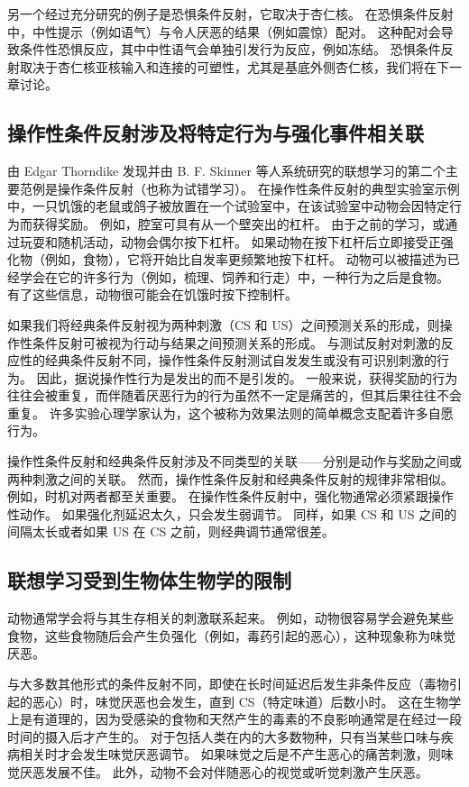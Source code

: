 另一个经过充分研究的例子是恐惧条件反射，它取决于杏仁核。
在恐惧条件反射中，中性提示（例如语气）与令人厌恶的结果（例如震惊）配对。
这种配对会导致条件性恐惧反应，其中中性语气会单独引发行为反应，例如冻结。
恐惧条件反射取决于杏仁核亚核输入和连接的可塑性，尤其是基底外侧杏仁核，我们将在下一章讨论。



\subsection{操作性条件反射涉及将特定行为与强化事件相关联}

由 Edgar Thorndike 发现并由 B. F. Skinner 等人系统研究的联想学习的第二个主要范例是操作条件反射（也称为试错学习）。
在操作性条件反射的典型实验室示例中，一只饥饿的老鼠或鸽子被放置在一个试验室中，在该试验室中动物会因特定行为而获得奖励。
例如，腔室可具有从一个壁突出的杠杆。 由于之前的学习，或通过玩耍和随机活动，动物会偶尔按下杠杆。
如果动物在按下杠杆后立即接受正强化物（例如，食物），它将开始比自发率更频繁地按下杠杆。
动物可以被描述为已经学会在它的许多行为（例如，梳理、饲养和行走）中，一种行为之后是食物。
有了这些信息，动物很可能会在饥饿时按下控制杆。


如果我们将经典条件反射视为两种刺激（CS 和 US）之间预测关系的形成，则操作性条件反射可被视为行动与结果之间预测关系的形成。
与测试反射对刺激的反应性的经典条件反射不同，操作性条件反射测试自发发生或没有可识别刺激的行为。
因此，据说操作性行为是发出的而不是引发的。
一般来说，获得奖励的行为往往会被重复，而伴随着厌恶行为的行为虽然不一定是痛苦的，但其后果往往不会重复。
许多实验心理学家认为，这个被称为效果法则的简单概念支配着许多自愿行为。


操作性条件反射和经典条件反射涉及不同类型的关联——分别是动作与奖励之间或两种刺激之间的关联。
然而，操作性条件反射和经典条件反射的规律非常相似。 例如，时机对两者都至关重要。
在操作性条件反射中，强化物通常必须紧跟操作性动作。
如果强化剂延迟太久，只会发生弱调节。
同样，如果 CS 和 US 之间的间隔太长或者如果 US 在 CS 之前，则经典调节通常很差。



\subsection{联想学习受到生物体生物学的限制}

动物通常学会将与其生存相关的刺激联系起来。
例如，动物很容易学会避免某些食物，这些食物随后会产生负强化（例如，毒药引起的恶心），这种现象称为味觉厌恶。


与大多数其他形式的条件反射不同，即使在长时间延迟后发生非条件反应（毒物引起的恶心）时，味觉厌恶也会发生，直到 CS（特定味道）后数小时。
这在生物学上是有道理的，因为受感染的食物和天然产生的毒素的不良影响通常是在经过一段时间的摄入后才产生的。
对于包括人类在内的大多数物种，只有当某些口味与疾病相关时才会发生味觉厌恶调节。
如果味觉之后是不产生恶心的痛苦刺激，则味觉厌恶发展不佳。
此外，动物不会对伴随恶心的视觉或听觉刺激产生厌恶。



